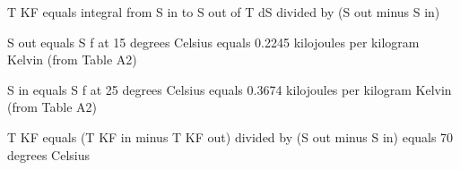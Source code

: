 T KF equals integral from S in to S out of T dS divided by (S out minus S in)  

S out equals S f at 15 degrees Celsius equals 0.2245 kilojoules per kilogram Kelvin (from Table A2)  

S in equals S f at 25 degrees Celsius equals 0.3674 kilojoules per kilogram Kelvin (from Table A2)  

T KF equals (T KF in minus T KF out) divided by (S out minus S in) equals 70 degrees Celsius